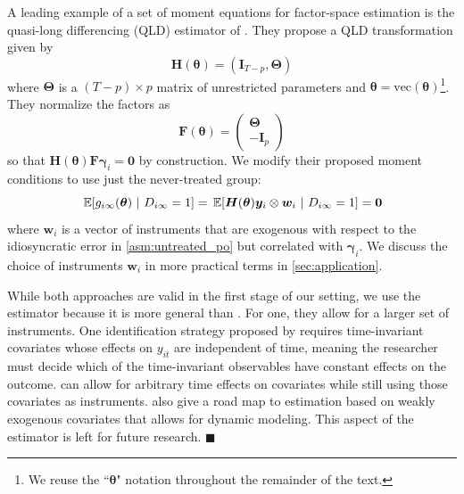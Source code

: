 \begin{remark}\label{remark:QLD}
A leading example of a set of moment equations for factor-space estimation is the quasi-long differencing (QLD) estimator of \citet{Ahn_Lee_Schmidt_2013}. They propose a QLD transformation given by 
\begin{equation}
  \bm H(\bm \theta) = (\bm I_{T-p}, \bm \Theta)
\end{equation}
where $\bm \Theta$ is a $(T-p) \times p$ matrix of unrestricted parameters and $\bm \theta = \text{vec}(\bm \theta)$\footnote{We reuse the ``$\bm \theta$" notation throughout the remainder of the text.}. They normalize the factors as 
\begin{equation}
  \bm{F}(\bm \theta) = 
  \begin{pmatrix}
    \bm \Theta\\
    -\bm I_p
  \end{pmatrix}
\end{equation}
so that $\bm H(\bm \theta) \bm{F} \bm \gamma_i = \bm 0$ by construction. We modify their proposed moment conditions to use just the never-treated group:
\begin{equation}
  \expec{g_{i\infty}(\bm{\theta})}{D_{i\infty} = 1} = \expec{\bm H(\bm \theta) \bm y_i \otimes \bm w_i}{D_{i\infty} = 1} = \bm 0
\end{equation}
where $\bm w_i$ is a vector of instruments that are exogenous with respect to the idiosyncratic error in \autoref{asm:untreated_po} but correlated with $\bm \gamma_i$. We discuss the choice of instruments $\bm w_i$ in more practical terms in \autoref{sec:application}.

While both approaches are valid in the first stage of our setting, we use the \citet{Ahn_Lee_Schmidt_2013} estimator because it is more general than \citet{Callaway_Karami_2020}. For one, they allow for a larger set of instruments. One identification strategy proposed by \citet{Callaway_Karami_2020} requires time-invariant covariates whose effects on $y_{it}$ are independent of time, meaning the researcher must decide which of the time-invariant observables have constant effects on the outcome. \citet{Ahn_Lee_Schmidt_2013} can allow for arbitrary time effects on covariates while still using those covariates as instruments. \citet{Ahn_Lee_Schmidt_2013} also give a road map to estimation based on weakly exogenous covariates that allows for dynamic modeling. This aspect of the estimator is left for future research.
$\blacksquare$
\end{remark}


